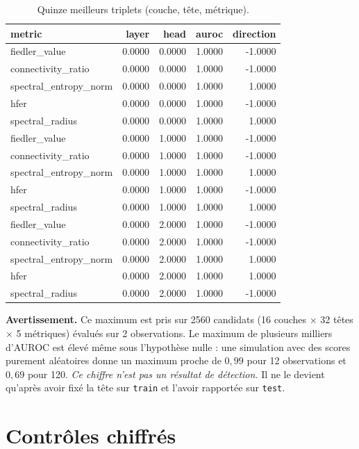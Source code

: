 \documentclass[11pt,a4paper]{article}
\begin{document}
\begin{table}[htbp]
\centering
\small
\begin{tabular}{lrrrr}
\hline
metric & layer & head & auroc & direction \\
\hline
fiedler\_value & 0.0000 & 0.0000 & 1.0000 & -1.0000 \\
connectivity\_ratio & 0.0000 & 0.0000 & 1.0000 & -1.0000 \\
spectral\_entropy\_norm & 0.0000 & 0.0000 & 1.0000 & 1.0000 \\
hfer & 0.0000 & 0.0000 & 1.0000 & -1.0000 \\
spectral\_radius & 0.0000 & 0.0000 & 1.0000 & 1.0000 \\
fiedler\_value & 0.0000 & 1.0000 & 1.0000 & -1.0000 \\
connectivity\_ratio & 0.0000 & 1.0000 & 1.0000 & -1.0000 \\
spectral\_entropy\_norm & 0.0000 & 1.0000 & 1.0000 & 1.0000 \\
hfer & 0.0000 & 1.0000 & 1.0000 & -1.0000 \\
spectral\_radius & 0.0000 & 1.0000 & 1.0000 & 1.0000 \\
fiedler\_value & 0.0000 & 2.0000 & 1.0000 & -1.0000 \\
connectivity\_ratio & 0.0000 & 2.0000 & 1.0000 & -1.0000 \\
spectral\_entropy\_norm & 0.0000 & 2.0000 & 1.0000 & 1.0000 \\
hfer & 0.0000 & 2.0000 & 1.0000 & 1.0000 \\
spectral\_radius & 0.0000 & 2.0000 & 1.0000 & -1.0000 \\
\hline
\end{tabular}
\caption{Quinze meilleurs triplets (couche, tête, métrique).}
\label{tab:heads}
\end{table}


\textbf{Avertissement.} Ce maximum est pris sur 2560 candidats
(16 couches $\times$ 32 têtes
$\times$ 5 métriques) évalués sur 2
observations. Le maximum de plusieurs milliers d'AUROC est élevé même sous
l'hypothèse nulle : une simulation avec des scores purement aléatoires donne
un maximum proche de $0{,}99$ pour 12 observations et $0{,}69$ pour 120.
\emph{Ce chiffre n'est pas un résultat de détection.} Il ne le devient
qu'après avoir fixé la tête sur \texttt{train} et l'avoir rapportée sur
\texttt{test}.


\section{Contrôles chiffrés}
\end{document}

